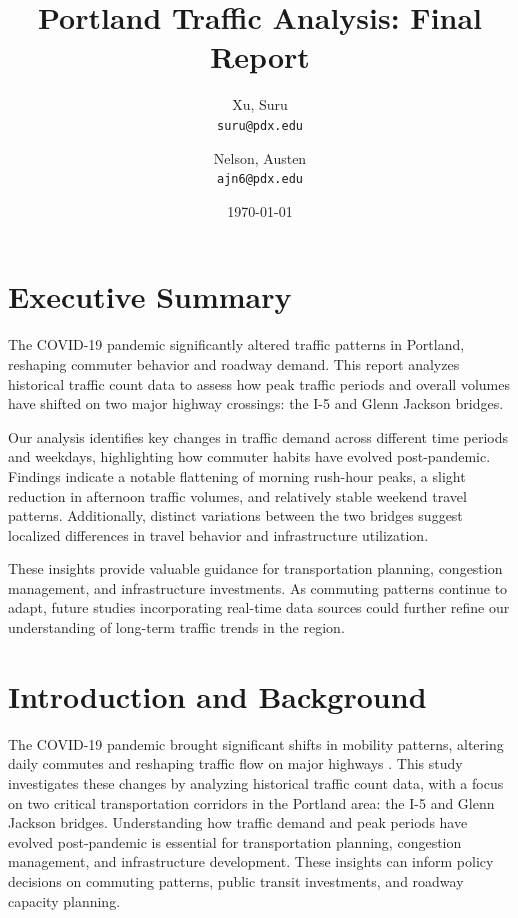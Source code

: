 \documentclass{article}
\title{Portland Traffic Analysis: Final Report}
\author{
  Xu, Suru\\
  \texttt{suru@pdx.edu}
  \and
  Nelson, Austen\\
  \texttt{ajn6@pdx.edu}
}
\date{\today}
\begin{document}
\maketitle

\tableofcontents

\section{Executive Summary}

The COVID-19 pandemic significantly altered traffic patterns in Portland, reshaping commuter behavior and roadway demand. This report analyzes historical traffic count data to assess how peak traffic periods and overall volumes have shifted on two major highway crossings: the I-5 and Glenn Jackson bridges.

Our analysis identifies key changes in traffic demand across different time periods and weekdays, highlighting how commuter habits have evolved post-pandemic. Findings indicate a notable flattening of morning rush-hour peaks, a slight reduction in afternoon traffic volumes, and relatively stable weekend travel patterns. Additionally, distinct variations between the two bridges suggest localized differences in travel behavior and infrastructure utilization.

These insights provide valuable guidance for transportation planning, congestion management, and infrastructure investments. As commuting patterns continue to adapt, future studies incorporating real-time data sources could further refine our understanding of long-term traffic trends in the region.

\section{Introduction and Background}
The COVID-19 pandemic brought significant shifts in mobility patterns, altering daily commutes and reshaping traffic flow on major highways \cite{covid_mobility_emissions, traffic_hiatus_covid}. This study investigates these changes by analyzing historical traffic count data, with a focus on two critical transportation corridors in the Portland area: the I-5 and Glenn Jackson bridges. Understanding how traffic demand and peak periods have evolved post-pandemic is essential for transportation planning, congestion management, and infrastructure development. These insights can inform policy decisions on commuting patterns, public transit investments, and roadway capacity planning.
\end{document}
